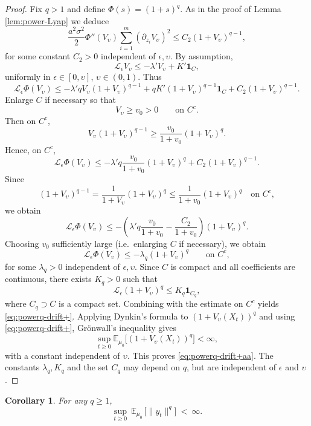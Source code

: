 \documentclass[11pt, a4paper,leqno]{amsart}
\newtheorem{corollary}{Corollary}[section]
\theoremstyle{definition}
\numberwithin{equation}{section}
\begin{document}
\begin{proof}  Fix $q>1$ and define $\Phi(s)=(1+s)^q$. As in the proof of Lemma \ref{lem:power-Lyap} we deduce \[
\frac{a^2\sigma^2}{2}
\Phi''(V_\upsilon)
\sum_{i=1}^m (\partial_{z_i}V_\upsilon)^2
\le C_2 (1+V_\upsilon)^{q-1},
\]
for some constant $C_2>0$ independent of $\epsilon,\upsilon$. By assumption,
\[
{\mathcal L}_\epsilon V_\upsilon
\le -\lambda' V_\upsilon + K' \mathbf 1_C,
\]
uniformly in $\epsilon\in[0,\upsilon]$, $\upsilon\in(0,1)$.
Thus
\[
{\mathcal L}_\epsilon \Phi(V_\upsilon)
\le
- \lambda' q V_\upsilon (1+V_\upsilon)^{q-1}
+ qK'(1+V_\upsilon)^{q-1}\mathbf 1_C
+ C_2 (1+V_\upsilon)^{q-1}.
\]
Enlarge $C$ if necessary so that
\[
V_\upsilon \ge v_0>0
\qquad \text{on } C^c.
\]
Then on $C^c$,
\[
V_\upsilon (1+V_\upsilon)^{q-1}
\ge \frac{v_0}{1+v_0}(1+V_\upsilon)^q.
\]
Hence, on $C^c$,
\[
{\mathcal L}_\epsilon \Phi(V_\upsilon)
\le
- \lambda' q \frac{v_0}{1+v_0}(1+V_\upsilon)^q
+ C_2 (1+V_\upsilon)^{q-1}.
\]
Since
\[
(1+V_\upsilon)^{q-1}
= \frac{1}{1+V_\upsilon}(1+V_\upsilon)^q
\le \frac{1}{1+v_0}(1+V_\upsilon)^q
\quad \text{on } C^c,
\]
we obtain
\[
{\mathcal L}_\epsilon \Phi(V_\upsilon)
\le
-\left(
\lambda' q \frac{v_0}{1+v_0}
- \frac{C_2}{1+v_0}
\right)
(1+V_\upsilon)^q .
\]
Choosing $v_0$ sufficiently large (i.e.\ enlarging $C$ if necessary),
we obtain
\[
{\mathcal L}_\epsilon \Phi(V_\upsilon)
\le -\lambda_q (1+V_\upsilon)^q
\qquad \text{on } C^c,
\]
for some $\lambda_q>0$ independent of $\epsilon,\upsilon$. Since $C$ is compact and all coefficients are continuous,
there exists $K_q>0$ such that
\[
{\mathcal L}_\epsilon (1+V_\upsilon)^q
\le K_q \mathbf 1_{C_q},
\]
where $C_q\supset C$ is a compact set.
Combining with the estimate on $C^c$ yields
\eqref{eq:powerq-drift+}. Applying Dynkin's formula to $(1+V_\upsilon(X_t))^q$
and using \eqref{eq:powerq-drift+},
Grönwall's inequality gives
\[
\sup_{t\ge0}
\mathbb E_{\mu_0}\bigl[(1+V_\upsilon(X_t))^q\bigr]
<\infty,
\]
with a constant independent of $\upsilon$.
This proves \eqref{eq:powerq-drift+aa}. The constants $\lambda_q,K_q$ and the set $C_q$
may depend on $q$, but are independent of $\epsilon$ and $\upsilon$.
\end{proof}



\begin{corollary}\label{cor:y-2+delta}
For any $q\geq 1$,
\[
\sup_{t\ge0}\ \mathbb E_{\mu_0}\,\bigl[\| y_t\|^{q}\bigr]\ <\ \infty.
\]
\end{corollary}
\end{document}
